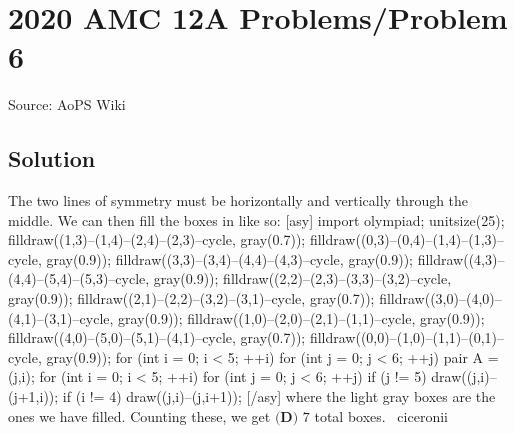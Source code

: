 \documentclass[12pt]{article}
\begin{document}
\section*{{2020 AMC 12A Problems/Problem 6}}
Source: AoPS Wiki

\subsection*{Solution}
The two lines of symmetry must be horizontally and vertically through the middle. We can then fill the boxes in like so: [asy] import olympiad; unitsize(25); filldraw((1,3)--(1,4)--(2,4)--(2,3)--cycle, gray(0.7)); filldraw((0,3)--(0,4)--(1,4)--(1,3)--cycle, gray(0.9)); filldraw((3,3)--(3,4)--(4,4)--(4,3)--cycle, gray(0.9)); filldraw((4,3)--(4,4)--(5,4)--(5,3)--cycle, gray(0.9)); filldraw((2,2)--(2,3)--(3,3)--(3,2)--cycle, gray(0.9)); filldraw((2,1)--(2,2)--(3,2)--(3,1)--cycle, gray(0.7)); filldraw((3,0)--(4,0)--(4,1)--(3,1)--cycle, gray(0.9)); filldraw((1,0)--(2,0)--(2,1)--(1,1)--cycle, gray(0.9)); filldraw((4,0)--(5,0)--(5,1)--(4,1)--cycle, gray(0.7)); filldraw((0,0)--(1,0)--(1,1)--(0,1)--cycle, gray(0.9)); for (int i = 0; i < 5; ++i) { for (int j = 0; j < 6; ++j) { pair A = (j,i); } } for (int i = 0; i < 5; ++i) { for (int j = 0; j < 6; ++j) { if (j != 5) { draw((j,i)--(j+1,i)); } if (i != 4) { draw((j,i)--(j,i+1)); } } } [/asy] where the light gray boxes are the ones we have filled. Counting these, we get $\boxed{\textbf{(D) } 7}$ total boxes. ~ciceronii
\end{document}
